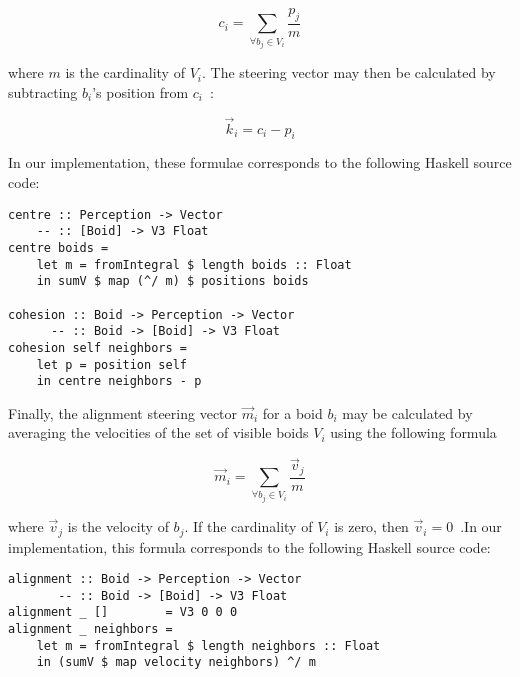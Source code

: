 \[ c_i = \sum\limits_{\forall b_j \in V_i} \frac{p_j}{m} \]

where $m$ is the cardinality of $V_i$. The steering vector may then be calculated by subtracting $b_i$'s position from $c_i$~\cite{hartman2006autonomous}:

\[ \vec{k}_i = c_i - p_i \]

In our implementation, these formulae corresponds to the following Haskell source code:

\begin{verbatim}
centre :: Perception -> Vector
    -- :: [Boid] -> V3 Float
centre boids =
    let m = fromIntegral $ length boids :: Float
    in sumV $ map (^/ m) $ positions boids

cohesion :: Boid -> Perception -> Vector
      -- :: Boid -> [Boid] -> V3 Float
cohesion self neighbors =
    let p = position self
    in centre neighbors - p
\end{verbatim}

Finally, the alignment steering vector $\vec{m}_i$ for a boid $b_i$ may be calculated by averaging the velocities of the set of visible boids $V_i$ using the following formula

\[ \vec{m}_i = \sum\limits_{\forall b_j \in V_i} \frac{\vec{v}_j}{m} \]

where $\vec{v}_j$ is the velocity of $b_j$. If the cardinality of $V_i$ is zero, then $\vec{v}_i = 0$~\cite{hartman2006autonomous}.In our implementation, this formula corresponds to the following Haskell source code:

\begin{verbatim}
alignment :: Boid -> Perception -> Vector
       -- :: Boid -> [Boid] -> V3 Float
alignment _ []        = V3 0 0 0
alignment _ neighbors =
    let m = fromIntegral $ length neighbors :: Float
    in (sumV $ map velocity neighbors) ^/ m
\end{verbatim}
\vfill
\pagebreak

 
 

